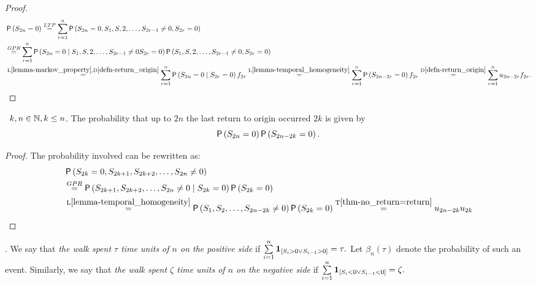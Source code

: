 \begin{proof}
  \[
    \begin{split}
      & \pr \left(S_{2n}=0\right)
      \ltp \suma[r][1][n] \pr \left(S_{2n}=0,S_1, S,2, \ldots, S_{2r-1}\neq 0, S_{2r}=0\right)\\
      & \gpr \suma[r][1][n] \pr \left(S_{2n}=0 \Mid S_1, S,2, \ldots, S_{2r-1}\neq 0 S_{2r}=0\right)\pr \left(S_1, S,2, \ldots, S_{2r-1}\neq 0, S_{2r}=0\right)\\
      & \overset{\text{L}\ref{lemma-markov_property} \text{,D}\ref{defn-return_origin}}{=}\suma[r][1][n] \pr \left(S_{2n}=0 \Mid S_{2r}=0\right) f_{2r}
      \overset{\text{L}\ref{lemma-temporal_homogeneity}}{=}\suma[r][1][n]
      \pr \left(S_{2n-2r}=0\right) f_{2r}\overset{\text{D}\ref{defn-return_origin}}{=}
      \suma[r][1][n] u_{2n-2r}f_{2r}.
    \end{split}
  \]
\end{proof}
\begin{thm}\label{thm-arcsine_last_visits}
 \Lrws\ $k,n \in \mathbb{N}, k\leq n$.
 The probability that up to \Time $2n$ the last return to origin occurred \intime $2k$ is given by
\[
\operatorname{\mathsf{P}}\left( S_{2n}=0\right)\operatorname{\mathsf{P}}\left( S_{2n-2k}=0\right).
\]
\end{thm}
\begin{proof}
 The probability involved can be rewritten as:
 \[
  \begin{split}
    & \operatorname{\mathsf{P}} \left(S_{2k}=0, S_{2k+1}, S_{2k+2}, \ldots, S_{2n} \neq 0\right)\\
    & \overset{GPR}{=} \operatorname{\mathsf{P}} \left( S_{2k+1}, S_{2k+2}, \ldots, S_{2n}\neq 0\mid S_{2k}=0 \right) \operatorname{\mathsf{P}} \left( S_{2k}=0 \right)\\
    & \overset{\text{L}\ref{lemma-temporal_homogeneity}}{=}\operatorname{\mathsf{P}} \left( S_{1}, S_{2}, \ldots, S_{2n-2k}\neq 0 \right) \operatorname{\mathsf{P}} \left( S_{2k}=0 \right)
    \overset{\text{T}\ref{thm-no_return=return}}{=}u_{2n-2k}u_{2k}
  \end{split}
\]
\end{proof}
\begin{defn}\label{defn-time_spent_positive_side}

 \Lrw. We say that \emph{the walk spent $\tau$ time units of $n$ on the positive side} if $\suma \indikator{S_i>0 \lor S_{i-1}>0}=\tau.$
 Let $\beta_{n} \left( \tau \right) $ denote the probability of such an event.
 Similarly, we say that \emph{the walk spent $\zeta$ time units of $n$ on the negative side} if
 $\suma\indikator{S_i<0 \lor S_{i-1}<0}=\zeta.$
\end{defn}


